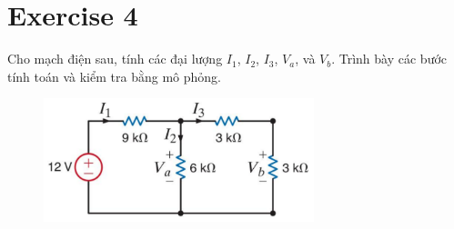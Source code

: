 \section{Exercise 4}
Cho mạch điện sau, tính các đại lượng \(I_1\), \(I_2\), \(I_3\), \(V_a\), và \(V_b\).
Trình bày các bước tính toán và kiểm tra bằng mô phỏng.
\begin{figure}[!htbp]
    \centering
    \includegraphics[width=0.7\textwidth]{graphics/ex4/f1.png}
\end{figure}
